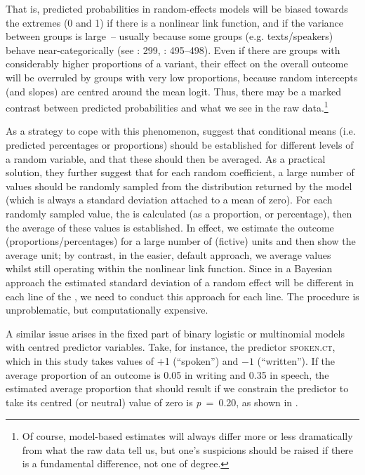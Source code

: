 That is, predicted probabilities in random-effects models will be biased towards the extremes (0 and 1) if there is a nonlinear link function, and if the variance between groups is large~– usually because some groups (e.g. texts/speakers) behave near-categorically (see \citealt{MolenberghsVerbeke2005}: 299, \citealt{Agresti2013}: 495–498). Even if there are groups with considerably higher proportions of a variant, their effect on the overall outcome will be overruled by groups with very low proportions, because random intercepts (and slopes) are centred around the mean logit. Thus, there may be a marked contrast between predicted probabilities and what we see in the raw data.\footnote{Of course, model-based estimates will always differ more or less dramatically from what the raw data tell us, but one’s suspicions should be raised if there is a fundamental difference, not one of degree.}

As a strategy to cope with this phenomenon, \citet[301]{MolenberghsVerbeke2005} suggest that conditional means (i.e. predicted percentages or proportions) should be established for different levels of a random variable, and that these should then be averaged. As a practical solution, they further suggest that for each random coefficient, a large number of values should be randomly sampled from the distribution returned by the model (which is always a standard deviation attached to a mean of zero). For each randomly sampled value, the  is calculated (as a proportion, or percentage), then the average of these values is established. In effect, we estimate the outcome (proportions\slash percentages) for a large number of (fictive) units and then show the average unit; by contrast, in the easier, default approach, we average values whilst still operating within the nonlinear link function. Since in a Bayesian approach the estimated standard deviation of a random effect will be different in each line of the , we need to conduct this  approach for each line. The procedure is unproblematic, but computationally expensive.

A similar issue arises in the fixed part of binary logistic or multinomial models with centred predictor variables. Take, for instance, the predictor \textsc{spoken.ct}, which in this study takes values of +1 (“spoken”) and $-1$ (“written”). If the average proportion of an outcome is 0.05 in writing and 0.35 in speech, the estimated average proportion that should result if we constrain the predictor to take its centred (or neutral) value of zero is \textit{p}~=~0.20, as shown in .

